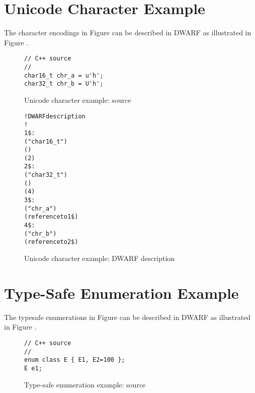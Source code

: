 \clearpage
\section{Unicode Character Example}
\label{app:unicodecharacterexample}
The  character encodings in
Figure 
can be described in DWARF as illustrated in 
Figure .

\begin{figure}[!ht]
\begin{lstlisting}[numbers=none]
// C++ source
//
char16_t chr_a = u'h';
char32_t chr_b = U'h';
\end{lstlisting}
\caption{Unicode character example: source}
\label{fig:unicodecharacterexamplesource}
\end{figure}

\begin{figure}[ht]
\begin{dwflisting}
\begin{alltt}

! DWARF description
!
1\$: \DWTAGbasetype
        \DWATname("char16\_t")
        \DWATencoding(\DWATEUTF)
        \DWATbytesize(2)
2\$: \DWTAGbasetype
        \DWATname("char32\_t")
        \DWATencoding(\DWATEUTF)
        \DWATbytesize(4)
3\$: \DWTAGvariable
        \DWATname("chr\_a")
        \DWATtype(reference to 1\$)
4\$: \DWTAGvariable
        \DWATname("chr\_b")
        \DWATtype(reference to 2\$)
\end{alltt}
\end{dwflisting}
\caption{Unicode character example: DWARF description}
\label{fig:unicodecharacterexampledwarfdescription}
\end{figure}

\clearpage
\section{Type-Safe Enumeration Example}
\label{app:typesafeenumerationexample}

The  type\dash safe enumerations in
Figure 
can be described in DWARF as illustrated in 
Figure .

\begin{figure}[ht]
\begin{lstlisting}[numbers=none]
// C++ source
//
enum class E { E1, E2=100 };
E e1;
\end{lstlisting}
\caption{Type-safe enumeration example: source}
\label{fig:ctypesafeenumerationexamplesource}
\end{figure}

